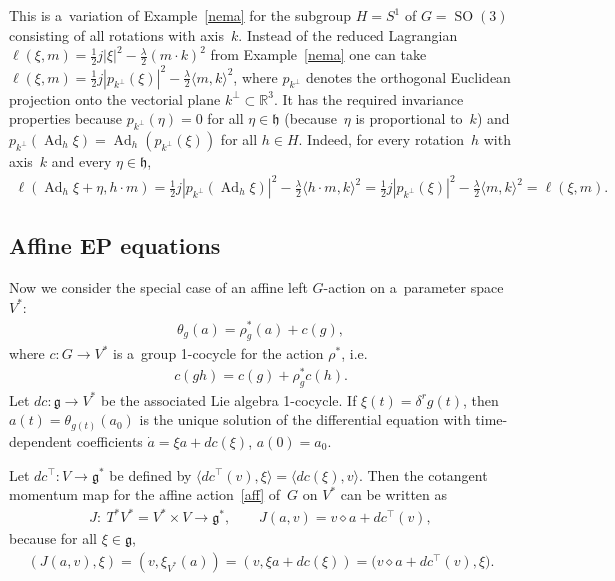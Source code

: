 \documentclass[pdftex]{sigma}
\numberwithin{equation}{section}
\begin{document}
\begin{Example}
This is a~variation of Example~\ref{nema} for the subgroup $H=S^1$ of $G=\operatorname{SO}(3)$ consisting of all
rotations with axis~$k$.
Instead of the reduced Lagrangian $\ell(\xi,m)=\frac12 j|\xi|^2-\frac{\lambda}2(m\cdot k)^2$ from Example~\ref{nema} one
can take $\ell(\xi,m)=\frac12 j|p_{k^\perp}(\xi)|^2-\frac{\lambda}2 \langle m, k\rangle^2$, where $p_{k^\perp}$ denotes
the orthogonal Euclidean projection onto the vectorial plane $k^\perp\subset\mathbb R^3$.
It has the required invariance properties because $p_{k^\perp}(\eta)=0$ for all $\eta\in\mathfrak h$ (because~$\eta$ is
proportional to~$k$) and $p_{k^\perp}(\operatorname{Ad}_h\xi)=\operatorname{Ad}_{h}(p_{k^\perp}(\xi))$ for all $h\in H$.
Indeed, for every rotation~$h$ with axis~$k$ and every $\eta\in\mathfrak h$,
\begin{gather*}
\ell(\operatorname{Ad}_h\xi+\eta,h\cdot m)=\frac12 j|p_{k^\perp}(\operatorname{Ad}_h\xi)|^2-\frac{\lambda}{2}\langle
h\cdot m,k\rangle^2=\frac12 j|p_{k^\perp}(\xi)|^2-\frac{\lambda}{2}\langle m,k\rangle^2=\ell(\xi,m).
\end{gather*}
\end{Example}

\subsection{Af\/f\/ine EP equations}

Now we consider the special case of an af\/f\/ine left $G$-action on a~parameter space $V^*$:
\begin{gather}
\label{aff}
\theta_g(a)=\rho^*_{g}(a)+c(g),
\end{gather}
where $c:G\to V^*$ is a~group 1-cocycle for the action $\rho^*$, i.e.\
\begin{gather*}
c(gh)= c(g)+\rho^*_{g} c(h).
\end{gather*}
Let $dc:\mathfrak g\to V^*$ be the associated Lie algebra 1-cocycle.
If $\xi(t)=\delta^rg(t)$, then $a(t)=\theta_{g(t)}(a_0)$ is the unique solution of the dif\/ferential equation with
time-dependent coef\/f\/icients $\dot{a}=\xi a+dc(\xi)$, $ a(0)=a_0$.

\begin{Remark}
Let $dc^\top:V\to\mathfrak g^*$ be def\/ined by $\langle dc^\top(v),\xi\rangle=\langle dc(\xi),v\rangle$.
Then the cotangent momentum map for the af\/f\/ine action~\eqref{aff} of~$G$ on $V^*$ can be written as
\begin{gather}
\label{cota}
J: \ T^*V^*=V^*\times V\to\mathfrak g^*,
\qquad
J(a,v)=v\diamond a+dc^\top(v),
\end{gather}
because for all $\xi\in\mathfrak g$,
\begin{gather*}
(J(a,v),\xi)=(v,\xi_{V^*}(a))=(v,\xi a+dc(\xi))=\big(v\diamond a+dc^\top(v),\xi\big).
\end{gather*}
\end{Remark}
\end{document}
